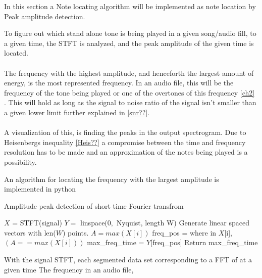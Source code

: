 In this section a Note locating algorithm will be implemented as note location by Peak amplitude detection.

To figure out which stand alone tone is being played in a given song/audio fill, to a given time, the STFT is analyzed, and the peak amplitude of the given time is located.\\
\\

The frequency with the highest amplitude, and henceforth the largest amount of energy, is the most represented frequency. 
In an audio file, this will be the frequency of the tone being played or one of the overtones of this frequency \ref{ch2} .
This will hold as long as the signal to noise ratio of the signal isn't smaller than a given lower limit further explained in \ref{snr??}. 
\\
\\
A visualization of this, is finding the peaks in the output spectrogram.
Due to Heisenbergs inequality \ref{Heis??}  a compromise between the time and frequency resolution has to be made and an approximation of the notes being played is a possibility.

An algorithm for locating the frequency with the largest amplitude  is implemented in python 
\begin{algorithm}[H]
\caption{Amplitude peak detection of short time Fourier transfrom}
\label{alg:FIR}
\begin{algorithmic}[1] 
\State  $X$ = STFT(signal) 
\State $Y =$ linspace($0,$ Nyquist, length W) \Comment Generate linear spaced vectors with len($W$) points.
		\State $A = max(X[i])$ 
		\State freq\_pos = where in $X$[i], $(A == max(X[i]))$ 
		\State max\_freq\_time = $Y$[freq\_pos]
	\EndFor
	\State Return max\_freq\_time
\EndProcedure
\end{algorithmic}
\end{algorithm}




With the signal STFT, each segmented data set corresponding to a FFT of at a given time 
The frequency in an audio file, 